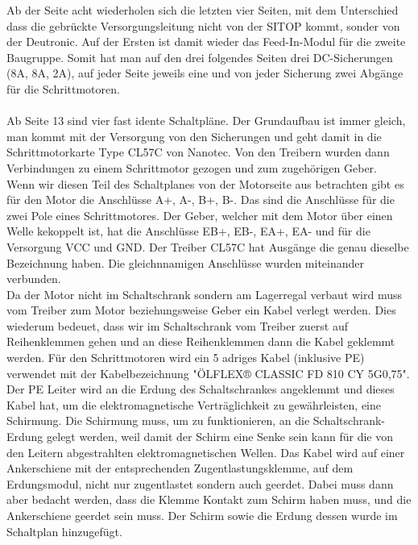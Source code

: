     Ab der Seite acht wiederholen sich die letzten vier Seiten, mit dem Unterschied dass die gebrückte Versorgungsleitung nicht von der SITOP kommt, sonder von der Deutronic. Auf der Ersten ist damit wieder das Feed-In-Modul für die zweite Baugruppe. Somit hat man auf den drei folgendes Seiten drei DC-Sicherungen (8A, 8A, 2A), auf jeder Seite jeweils eine und von jeder Sicherung zwei Abgänge für die Schrittmotoren.\\\\
    Ab Seite 13 sind vier fast idente Schaltpläne. Der Grundaufbau ist immer gleich, man kommt mit der Versorgung von den Sicherungen und geht damit in die Schrittmotorkarte Type CL57C von Nanotec. Von den Treibern wurden dann Verbindungen zu einem Schrittmotor gezogen und zum zugehörigen Geber.\\
    Wenn wir diesen Teil des Schaltplanes von der Motorseite aus betrachten gibt es für den Motor die Anschlüsse A+, A-, B+, B-. Das sind die Anschlüsse für die zwei Pole eines Schrittmotores. Der Geber, welcher mit dem Motor über einen Welle kekoppelt ist, hat die Anschlüsse EB+, EB-, EA+, EA-  und für die Versorgung VCC und GND. Der Treiber CL57C hat Ausgänge die genau dieselbe Bezeichnung haben. Die gleichnnamigen Anschlüsse wurden miteinander verbunden. \\Da der Motor nicht im Schaltschrank sondern am Lagerregal verbaut wird muss vom Treiber zum Motor beziehungsweise Geber ein Kabel verlegt werden. Dies wiederum bedeuet, dass wir im Schaltschrank vom Treiber zuerst auf Reihenklemmen gehen und an diese Reihenklemmen dann die Kabel geklemmt werden. Für den Schrittmotoren wird ein 5 adriges Kabel (inklusive PE) verwendet mit der Kabelbezeichnung "ÖLFLEX® CLASSIC FD 810 CY 5G0,75". Der PE Leiter wird an die Erdung des Schaltschrankes angeklemmt und dieses Kabel hat, um die elektromagnetische Verträglichkeit zu gewährleisten, eine Schirmung. Die Schirmung muss, um zu funktionieren, an die Schaltschrank-Erdung gelegt werden, weil damit der Schirm eine Senke sein kann für die von den Leitern abgestrahlten elektromagnetischen Wellen. Das Kabel wird auf einer Ankerschiene mit der entsprechenden Zugentlastungsklemme, auf dem Erdungsmodul, nicht nur zugentlastet sondern auch geerdet. Dabei muss dann aber bedacht werden, dass die Klemme Kontakt zum Schirm haben muss, und die Ankerschiene geerdet sein muss. Der Schirm sowie die Erdung dessen wurde im Schaltplan hinzugefügt. \\
